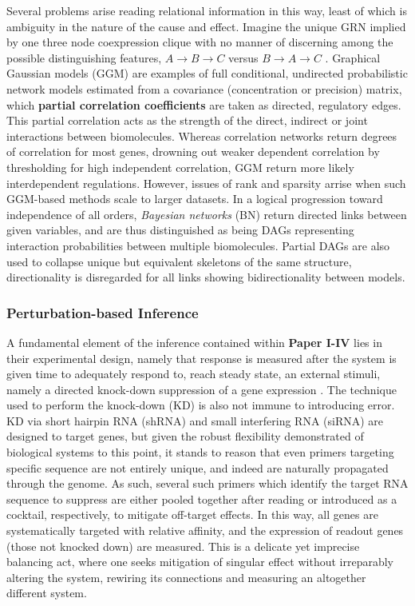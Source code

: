 Several problems arise reading relational information in this way, least of which is ambiguity in the nature of the cause and effect. Imagine the unique GRN implied by one three node coexpression clique with no manner of discerning among the possible distinguishing features, \eg $A\to B\to C$ versus $ B\to A\to C$ \citep{markowetz2007inferring}.
Graphical Gaussian models (GGM) are examples of full conditional, undirected probabilistic network models estimated from a covariance (\ie concentration or precision) matrix, which \textbf{partial correlation coefficients} are taken as directed, regulatory edges. This partial correlation acts as the strength of the direct, indirect or joint interactions between biomolecules. Whereas correlation networks return degrees of correlation for most genes, drowning out weaker dependent correlation by thresholding for high independent correlation, GGM return more likely interdependent regulations\citep{schafer2004empirical}. However, issues of rank and sparsity arrise when such GGM-based methods scale to larger datasets. In a logical progression toward independence of all orders, \emph{Bayesian networks} (BN) return directed links between given variables, and are thus distinguished as being DAGs representing interaction probabilities between multiple biomolecules. Partial DAGs are also used to collapse unique but equivalent skeletons of the same structure, \ie directionality is disregarded for all links showing bidirectionality between models.


\subsubsection{Perturbation-based Inference}
\label{sec:ODE}
A fundamental element of the inference contained within \textbf{Paper I-IV} lies in their experimental design, namely that response is measured after the system is given time to adequately respond to, \ie reach steady state, an external stimuli, namely a directed knock-down suppression of a gene expression \citep{pinna2010knockouts,oates2012network,yip2010improved}. The technique used to perform the knock-down (KD) is also not immune to introducing error. KD via short hairpin RNA (shRNA) and small interfering RNA (siRNA) are designed to target genes, but given the robust flexibility demonstrated of biological systems to this point, it stands to reason that even primers targeting specific sequence are not entirely unique, and indeed are naturally propagated through the genome. As such, several such primers which identify the target RNA sequence to suppress are either pooled together after reading or introduced as a cocktail, respectively, to mitigate off-target effects. In this way, all genes are systematically targeted with relative affinity, and the expression of readout genes (those not knocked down) are measured. This is a delicate yet imprecise balancing act, where one seeks mitigation of singular effect without irreparably altering the system, rewiring its connections and measuring an altogether different system. 

